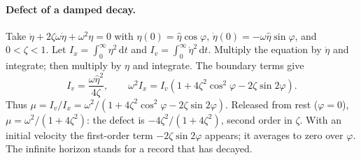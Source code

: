 \documentclass[preprint,12pt]{elsarticle}
\begin{document}
\paragraph{Defect of a damped decay.} Take $\ddot\eta+2\zeta\omega\dot\eta+\omega^2\eta=0$ with $\eta(0)=\hat\eta\cos\varphi$, $\dot\eta(0)=-\omega\hat\eta\sin\varphi$, and $0<\zeta<1$. Let $I_x=\int_0^\infty\eta^2\,\mathrm{d}t$ and $I_v=\int_0^\infty\dot\eta^2\,\mathrm{d}t$. Multiply the equation by $\dot\eta$ and integrate; then multiply by $\eta$ and integrate. The boundary terms give
\begin{equation}
I_v=\frac{\omega\hat\eta^2}{4\zeta},\qquad
\omega^2 I_x=I_v\left(1+4\zeta^2\cos^2\varphi-2\zeta\sin2\varphi\right).
\end{equation}
Thus $\mu=I_v/I_x=\omega^2/(1+4\zeta^2\cos^2\varphi-2\zeta\sin2\varphi)$. Released from rest ($\varphi=0$), $\mu=\omega^2/(1+4\zeta^2)$: the defect is $-4\zeta^2/(1+4\zeta^2)$, second order in $\zeta$. With an initial velocity the first-order term $-2\zeta\sin2\varphi$ appears; it averages to zero over $\varphi$. The infinite horizon stands for a record that has decayed.
\end{document}
